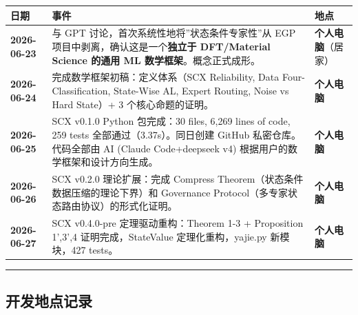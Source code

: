 \documentclass[
  12pt,
]{ctexart}
\begin{document}
\begin{longtable}[]{@{}
  >{\raggedright\arraybackslash}p{}
  >{\raggedright\arraybackslash}p{}
  >{\raggedright\arraybackslash}p{}@{}}
\toprule\noalign{}
\begin{minipage}[b]{\linewidth}\raggedright
日期
\end{minipage} & \begin{minipage}[b]{\linewidth}\raggedright
事件
\end{minipage} & \begin{minipage}[b]{\linewidth}\raggedright
地点
\end{minipage} \\
\midrule\noalign{}
\endhead
\bottomrule\noalign{}
\endlastfoot
\textbf{2026-06-23} & 与 GPT 讨论，首次系统性地将''状态条件专家性''从
EGP 项目中剥离，确认这是一个\textbf{独立于 DFT/Material Science 的通用
ML 数学框架}。概念正式成形。 & \textbf{个人电脑}（居家） \\
\textbf{2026-06-24} & 完成数学框架初稿：定义体系（SCX Reliability, Data
Four-Classification, State-Wise AL, Expert Routing, Noise vs Hard
State）+ 3 个核心命题的证明。 & \textbf{个人电脑} \\
\textbf{2026-06-25} & SCX v0.1.0 Python 包完成：30 files, 6,269 lines of
code, 259 tests 全部通过（3.37s）。同日创建 GitHub 私密仓库。代码全部由
AI (Claude Code+deepseek v4) 根据用户的数学框架和设计方向生成。 &
\textbf{个人电脑} \\
\textbf{2026-06-26} & SCX v0.2.0 理论扩展：完成 Compress
Theorem（状态条件数据压缩的理论下界）和 Governance
Protocol（多专家状态路由协议）的形式化证明。 & \textbf{个人电脑} \\
\textbf{2026-06-27} & SCX v0.4.0-pre 定理驱动重构：Theorem 1-3 +
Proposition 1',3',4 证明完成，StateValue 定理化重构，yajie.py
新模块，427 tests。 & \textbf{个人电脑} \\
\end{longtable}

\begin{center}\rule{0.5\linewidth}{0.5pt}\end{center}

\subsection{开发地点记录}\label{ux5f00ux53d1ux5730ux70b9ux8bb0ux5f55}
\end{document}
